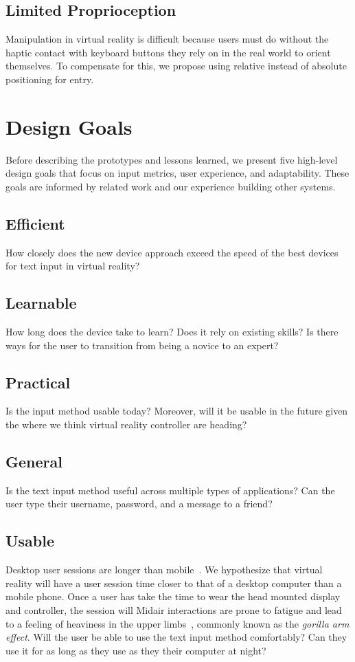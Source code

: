 \subsection{Limited Proprioception}
Manipulation in virtual reality is difficult because users must do without the haptic contact with keyboard buttons they rely on in the real world to orient themselves.
To compensate for this, we propose using relative instead of absolute positioning for entry.


\section{Design Goals}
Before describing the prototypes and lessons learned, we present five high-level design goals that focus on input metrics, user experience, and adaptability.
These goals are informed by related work and our experience building other systems.

\subsection{Efficient}
How closely does the new device approach exceed the speed of the best devices for text input in virtual reality?

\subsection{Learnable}
How long does the device take to learn?
Does it rely on existing skills?
Is there ways for the user to transition from being a novice to an expert?

\subsection{Practical}
Is the input method usable today?
Moreover, will it be usable in the future given the where we think virtual reality controller are heading?

\subsection{General}
Is the text input method useful across multiple types of applications?
Can the user type their username, password, and a message to a friend?

\subsection{Usable}
Desktop user sessions are longer than mobile~\cite{Kamvar:2009:CIM:1526709.1526817}.
We hypothesize that virtual reality will have a user session time closer to that of a desktop computer than a mobile phone.
Once a user has take the time to wear the head mounted display and controller, the session will
Midair interactions are prone to fatigue and lead to a feeling
of heaviness in the upper limbs~\cite{Hincapie-Ramos:2014:CEM:2556288.2557130}, commonly known as the \textit{gorilla arm effect}.
Will the user be able to use the text input method comfortably?
Can they use it for as long as they use as they their computer at night?

